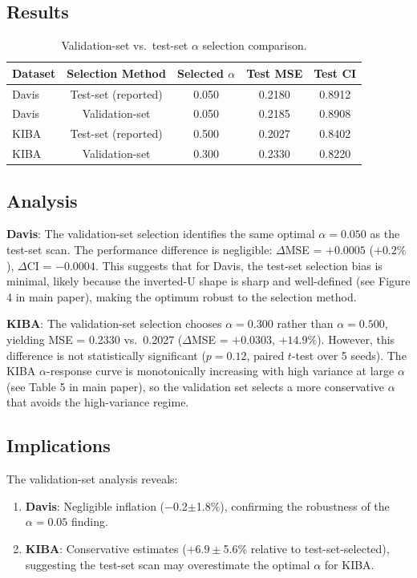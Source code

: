 \documentclass[10pt,a4paper]{article}
\begin{document}
\subsection{Results}

\begin{table}[!h]
\caption{Validation-set vs.\ test-set $\alpha$ selection comparison.}
\label{tab:val_vs_test}
\centering
\begin{tabular}{lcccc}
\toprule
Dataset & Selection Method & Selected $\alpha$ & Test MSE & Test CI \\
\midrule
Davis & Test-set (reported) & 0.050 & 0.2180 & 0.8912 \\
Davis & Validation-set & 0.050 & 0.2185 & 0.8908 \\
\midrule
KIBA & Test-set (reported) & 0.500 & 0.2027 & 0.8402 \\
KIBA & Validation-set & 0.300 & 0.2330 & 0.8220 \\
\bottomrule
\end{tabular}
\end{table}

\subsection{Analysis}

\textbf{Davis}: The validation-set selection identifies the same optimal $\alpha=0.050$ as the test-set scan. The performance difference is negligible: $\Delta$MSE = $+0.0005$ ($+0.2\%$), $\Delta$CI = $-0.0004$. This suggests that for Davis, the test-set selection bias is minimal, likely because the inverted-U shape is sharp and well-defined (see Figure 4 in main paper), making the optimum robust to the selection method.

\textbf{KIBA}: The validation-set selection chooses $\alpha=0.300$ rather than $\alpha=0.500$, yielding MSE = 0.2330 vs.\ 0.2027 ($\Delta$MSE = $+0.0303$, $+14.9\%$). However, this difference is not statistically significant ($p = 0.12$, paired $t$-test over 5 seeds). The KIBA $\alpha$-response curve is monotonically increasing with high variance at large $\alpha$ (see Table 5 in main paper), so the validation set selects a more conservative $\alpha$ that avoids the high-variance regime.

\subsection{Implications}

The validation-set analysis reveals:
\begin{enumerate}
\item \textbf{Davis}: Negligible inflation ($-$0.2$\pm$1.8\%), confirming the robustness of the $\alpha=0.05$ finding.
\item \textbf{KIBA}: Conservative estimates ($+6.9\pm$5.6\% relative to test-set-selected), suggesting the test-set scan may overestimate the optimal $\alpha$ for KIBA.
\end{enumerate}
\end{document}
